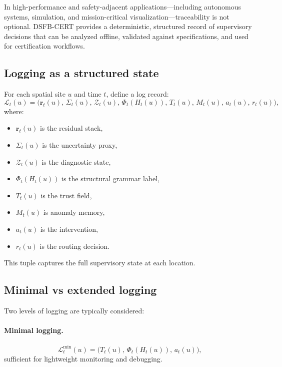 \documentclass[11pt]{article}
\theoremstyle{definition}
\theoremstyle{plain}
\begin{document}
In high-performance and safety-adjacent applications—including autonomous systems, simulation, and mission-critical visualization—traceability is not optional. DSFB-CERT provides a deterministic, structured record of supervisory decisions that can be analyzed offline, validated against specifications, and used for certification workflows.


\subsection{Logging as a structured state}

For each spatial site $u$ and time $t$, define a log record:
\begin{equation}
\mathcal{L}_t(u)=
\bigl(
\mathbf r_t(u),\,
\Sigma_t(u),\,
\mathcal{Z}_t(u),\,
\Phi_t(H_t(u)),\,
T_t(u),\,
M_t(u),\,
a_t(u),\,
r_t(u)
\bigr),
\end{equation}
where:
\begin{itemize}[leftmargin=1.5em]
    \item $\mathbf r_t(u)$ is the residual stack,
    \item $\Sigma_t(u)$ is the uncertainty proxy,
    \item $\mathcal{Z}_t(u)$ is the diagnostic state,
    \item $\Phi_t(H_t(u))$ is the structural grammar label,
    \item $T_t(u)$ is the trust field,
    \item $M_t(u)$ is anomaly memory,
    \item $a_t(u)$ is the intervention,
    \item $r_t(u)$ is the routing decision.
\end{itemize}

This tuple captures the full supervisory state at each location.


\subsection{Minimal vs extended logging}

Two levels of logging are typically considered:

\paragraph{Minimal logging.}
\begin{equation}
\mathcal{L}^{\mathrm{min}}_t(u)=\bigl(T_t(u),\,\Phi_t(H_t(u)),\,a_t(u)\bigr),
\end{equation}
sufficient for lightweight monitoring and debugging.
\end{document}
